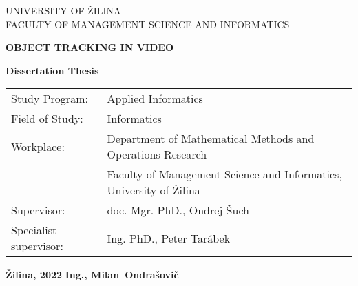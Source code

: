 \begin{titlepage}
    \begin{center}
        \vspace*{1cm} %

        \LARGE
        UNIVERSITY OF ŽILINA\\
        \Large
        FACULTY OF MANAGEMENT SCIENCE AND INFORMATICS\\

        \vspace{6cm}

        \LARGE
        \textbf{OBJECT TRACKING IN VIDEO}

        \vspace{1cm}

        \textbf{Dissertation Thesis}
    \end{center}

    \vspace{2cm}

    \vfill

    \normalsize

    \begin{tabular}{ll}
        Study Program:         & Applied Informatics                                                     \\
        Field of Study:        & Informatics                                                             \\
        Workplace:             & Department of Mathematical Methods and Operations Research              \\
                               & Faculty of Management Science and Informatics, University of \v{Z}ilina \\
        Supervisor:            & doc. Mgr. PhD., Ondrej \v{S}uch                                         \\
        Specialist supervisor: & Ing. PhD., Peter Tar\'{a}bek                                            \\
    \end{tabular}

    \vspace{2cm}

    \textbf{\v{Z}ilina, 2022} \hfill \textbf{Ing., Milan~Ondra\v{s}ovi\v{c}}

\end{titlepage}
